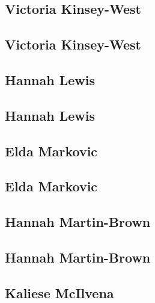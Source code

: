 \documentclass[twoside,14pt,a4paper,notitlepage]{memoir}
\begin{document}
\subsection*{Victoria Kinsey-West}
\label{aut:west}

\lipsum[1-2]
\subsection*{Victoria Kinsey-West}
\lipsum[3]



\subsection*{Hannah Lewis}
\label{aut:lewis}

\lipsum[1-2]
\subsection*{Hannah Lewis}
\lipsum[3]



\subsection*{Elda Markovic}
\label{aut:markovic}

\lipsum[1-2]
\subsection*{Elda Markovic}
\lipsum[3]



\subsection*{Hannah Martin-Brown}
\label{aut:brown}

\lipsum[1-2]
\subsection*{Hannah Martin-Brown}
\lipsum[3]



\subsection*{Kaliese McIlvena}
\label{aut:mcilvena}
\end{document}
